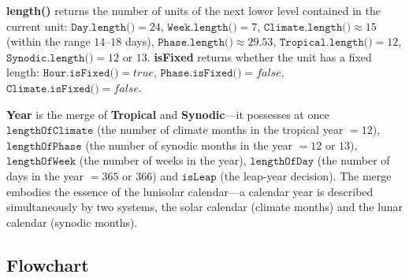 \begin{remark}\label{rem:temporal_unit_length}
\textbf{length()} returns the number of units of the next lower level contained in the current unit: \(\texttt{Day.length()}=24\), \(\texttt{Week.length()}=7\), \(\texttt{Climate.length()}\approx 15\) (within the range \(14\)--\(18\) days), \(\texttt{Phase.length()}\approx 29.53\), \(\texttt{Tropical.length()}=12\), \(\texttt{Synodic.length()}=12\) or \(13\). \textbf{isFixed} returns whether the unit has a fixed length: \(\texttt{Hour.isFixed()}=true\), \(\texttt{Phase.isFixed()}=false\), \(\texttt{Climate.isFixed()}=false\).
\end{remark}

\begin{remark}\label{rem:year_class}
\textbf{Year} is the merge of \textbf{Tropical} and \textbf{Synodic}---it possesses at once \(\texttt{lengthOfClimate}\) (the number of climate months in the tropical year \(=12\)), \(\texttt{lengthOfPhase}\) (the number of synodic months in the year \(=12\) or \(13\)), \(\texttt{lengthOfWeek}\) (the number of weeks in the year), \(\texttt{lengthOfDay}\) (the number of days in the year \(=365\) or \(366\)) and \(\texttt{isLeap}\) (the leap-year decision). The merge embodies the essence of the lunisolar calendar---a calendar year is described simultaneously by two systems, the solar calendar (climate months) and the lunar calendar (synodic months).
\end{remark}

\subsection{Flowchart}

